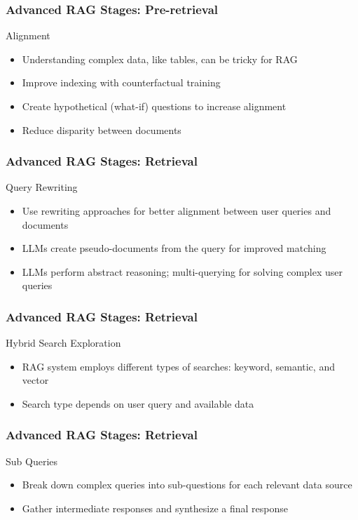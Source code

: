 \begin{frame}[fragile]\frametitle{Advanced RAG Stages: Pre-retrieval}
Alignment
  \begin{itemize}
    \item Understanding complex data, like tables, can be tricky for RAG
    \item Improve indexing with counterfactual training
    \item Create hypothetical (what-if) questions to increase alignment
    \item Reduce disparity between documents
  \end{itemize}
\end{frame}

\begin{frame}[fragile]\frametitle{Advanced RAG Stages: Retrieval}
Query Rewriting
  \begin{itemize}
    \item Use rewriting approaches for better alignment between user queries and documents
    \item LLMs create pseudo-documents from the query for improved matching
    \item LLMs perform abstract reasoning; multi-querying for solving complex user queries
  \end{itemize}
\end{frame}

\begin{frame}[fragile]\frametitle{Advanced RAG Stages: Retrieval}
Hybrid Search Exploration
  \begin{itemize}
    \item RAG system employs different types of searches: keyword, semantic, and vector
    \item Search type depends on user query and available data
  \end{itemize}
\end{frame}

\begin{frame}[fragile]\frametitle{Advanced RAG Stages: Retrieval}
Sub Queries
  \begin{itemize}
    \item Break down complex queries into sub-questions for each relevant data source
    \item Gather intermediate responses and synthesize a final response
  \end{itemize}
\end{frame}

